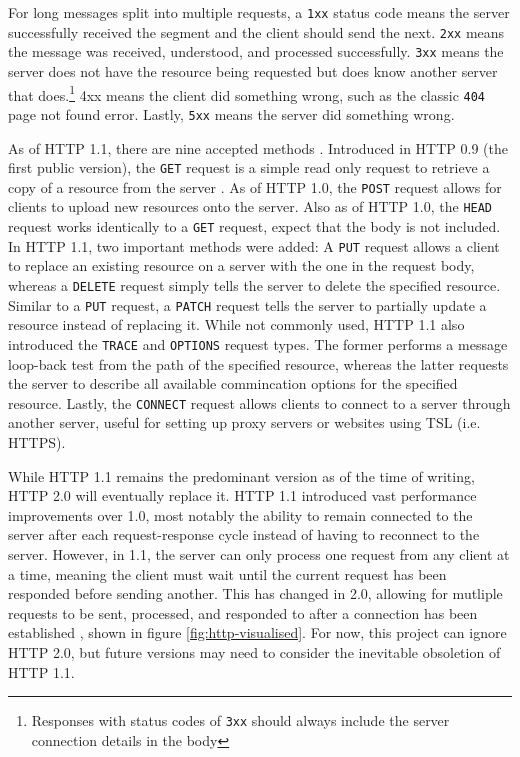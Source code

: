 \documentclass[11pt]{article}
\begin{document}
\inputminted[linenos=true]{html}{http_examples/get_response.html}

\begin{info}
For long messages split into multiple requests, a \texttt{1xx} status code means the server successfully received the segment and the client should send the next. \texttt{2xx} means the message was received, understood, and processed successfully. \texttt{3xx} means the server does not have the resource being requested but does know another server that does.\footnote{Responses with status codes of \texttt{3xx} should always include the server connection details in the body} 4xx means the client did something wrong, such as the classic \texttt{404} page not found error. Lastly, \texttt{5xx} means the server did something wrong.
\end{info}

As of HTTP 1.1, there are nine accepted methods \cite{http-methods}. Introduced in HTTP 0.9 (the first public version), the \texttt{GET} request is a simple read only request to retrieve a copy of a resource from the server \cite{http-0-9}. As of HTTP 1.0, the \texttt{POST} request allows for clients to upload new resources onto the server. Also as of HTTP 1.0, the \texttt{HEAD} request works identically to a \texttt{GET} request, expect that the body is not included. In HTTP 1.1, two important methods were added: A \texttt{PUT} request allows a client to replace an existing resource on a server with the one in the request body, whereas a \texttt{DELETE} request simply tells the server to delete the specified resource. Similar to a \texttt{PUT} request, a \texttt{PATCH} request tells the server to partially update a resource instead of replacing it. While not commonly used, HTTP 1.1 also introduced the \texttt{TRACE} and \texttt{OPTIONS} request types. The former performs a message loop-back test from the path of the specified resource, whereas the latter requests the server to describe all available commincation options for the specified resource. Lastly, the \texttt{CONNECT} request allows clients to connect to a server through another server, useful for setting up proxy servers or websites using TSL (i.e. HTTPS).

While HTTP 1.1 remains the predominant version as of the time of writing, HTTP 2.0 will eventually replace it. HTTP 1.1 introduced vast performance improvements over 1.0, most notably the ability to remain connected to the server after each request-response cycle instead of having to reconnect to the server. However, in 1.1, the server can only process one request from any client at a time, meaning the client must wait until the current request has been responded before sending another. This has changed in 2.0, allowing for mutliple requests to be sent, processed, and responded to after a connection has been established \cite{http2}, shown in figure \ref{fig:http-visualised}. For now, this project can ignore HTTP 2.0, but future versions may need to consider the inevitable obsoletion of HTTP 1.1.
\end{document}

